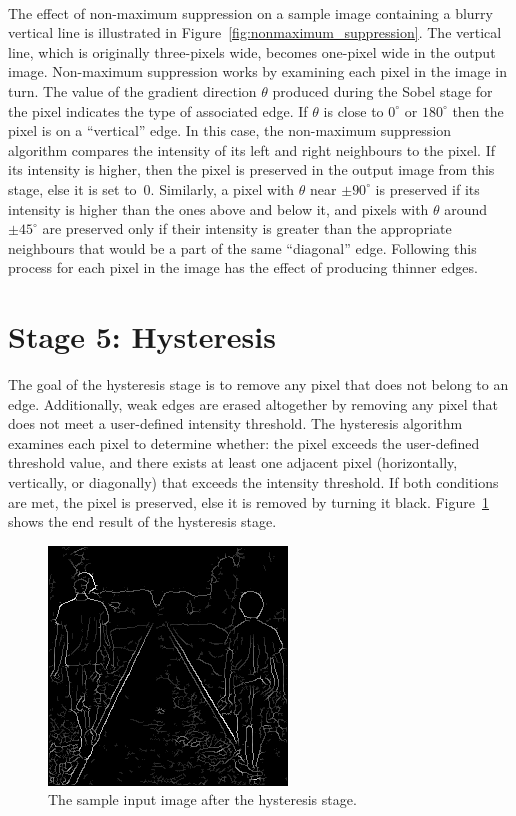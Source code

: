 \documentclass[epsfig,10pt,fullpage]{article}
\begin{document}
~\\
\noindent
The effect of non-maximum suppression on a sample image containing a blurry vertical line 
is illustrated in Figure~\ref{fig:nonmaximum_suppression}.
The vertical line, which is originally three-pixels wide, becomes one-pixel
wide in the output image. Non-maximum suppression works by examining each pixel in the 
image in turn. The value of the gradient direction $\theta$ produced during the Sobel stage
for the pixel indicates the type of associated edge. If $\theta$ is 
close to $0^\circ$ or $180^\circ$ then the pixel 
is on a ``vertical'' edge. In this case, the non-maximum suppression algorithm compares the 
intensity of its left and right neighbours to the pixel. If its intensity is higher,
then the pixel is preserved in the output image from this stage, else it is set to~0.
Similarly, a pixel with $\theta$ near $\pm90^\circ$ is preserved if its intensity is
higher than the ones above and below it, and pixels with $\theta$ around $\pm45^\circ$
are preserved only if their intensity is greater than the appropriate neighbours that would 
be a part of the same ``diagonal'' edge.
Following this process for each pixel in the image has the effect of producing thinner edges.

\noindent
\section*{Stage 5: Hysteresis}

The goal of the hysteresis stage is to remove any pixel that does not belong to an edge.
Additionally, weak edges are erased altogether by removing any pixel that does not meet 
a user-defined intensity threshold. The hysteresis algorithm examines each pixel to determine 
whether: the pixel exceeds the user-defined threshold value, and there exists at least 
one adjacent pixel (horizontally, vertically, or diagonally) that exceeds the intensity threshold.
If both conditions are met, the pixel is preserved, else it is removed by turning it black. 
Figure~\ref{fig:sample_stage5} shows the end result of the hysteresis stage. 
 
\begin{figure}[H]
   \begin{center}
       \includegraphics[scale = 0.85]{figures/fig_stage5_hysteresis.png}
   \end{center}
   \caption{The sample input image after the hysteresis stage.}
	\label{fig:sample_stage5}
\end{figure}
\end{document}
